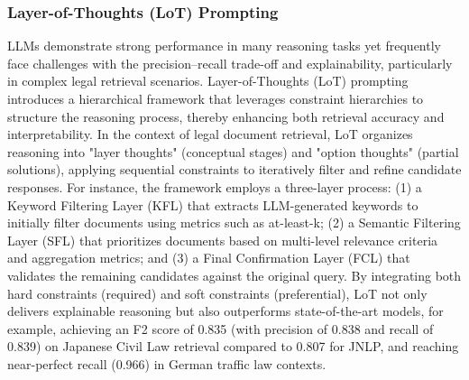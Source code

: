 \documentclass{article}
\begin{document}
\subsubsection{Layer-of-Thoughts (LoT) Prompting}
\label{lot}
\noindent LLMs demonstrate strong performance in many reasoning tasks yet frequently face challenges with the precision–recall trade-off and explainability, particularly in complex legal retrieval scenarios. Layer-of-Thoughts (LoT) prompting~\citep{fungwacharakorn2024layerofthoughtspromptinglotleveraging} introduces a hierarchical framework that leverages constraint hierarchies to structure the reasoning process, thereby enhancing both retrieval accuracy and interpretability. In the context of legal document retrieval, LoT organizes reasoning into "layer thoughts" (conceptual stages) and "option thoughts" (partial solutions), applying sequential constraints to iteratively filter and refine candidate responses. For instance, the framework employs a three-layer process: (1) a Keyword Filtering Layer (KFL) that extracts LLM-generated keywords to initially filter documents using metrics such as at-least-k; (2) a Semantic Filtering Layer (SFL) that prioritizes documents based on multi-level relevance criteria and aggregation metrics; and (3) a Final Confirmation Layer (FCL) that validates the remaining candidates against the original query. By integrating both hard constraints (required) and soft constraints (preferential), LoT not only delivers explainable reasoning but also outperforms state-of-the-art models, for example, achieving an F2 score of 0.835 (with precision of 0.838 and recall of 0.839) on Japanese Civil Law retrieval compared to 0.807 for JNLP, and reaching near-perfect recall (0.966) in German traffic law contexts.
\end{document}
